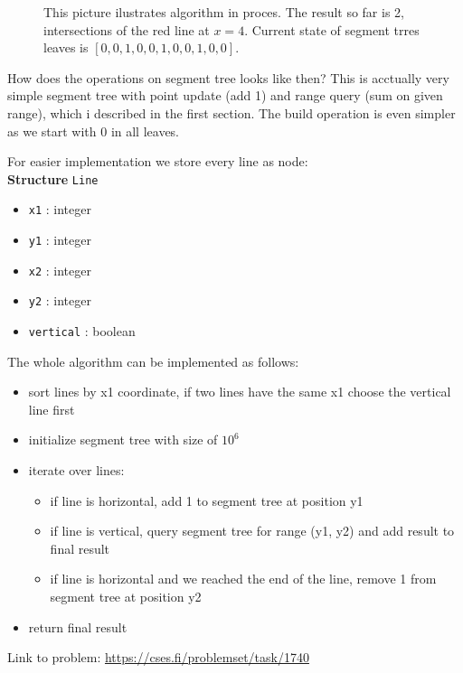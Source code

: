 \documentclass{article}
\begin{document}
\begin{figure}[H]
    \centering
    
    \caption{This picture ilustrates algorithm in proces. The result so far is 2, intersections of the red line at $x=4$. Current state of segment trres leaves is $[0,0,1,0,0,1,0,0,1,0,0]$. }
\end{figure}

How does the operations on segment tree looks like then? 
This is acctually very simple segment tree with point update (add 1) and range query (sum on given range), which i described in the first section. The build operation is even simpler as we start with 0 in all leaves.

For easier implementation we store every line as node: \\
\textbf{Structure} \texttt{Line}
\begin{itemize}
    \item \texttt{x1} : integer
    \item \texttt{y1} : integer
    \item \texttt{x2} : integer
    \item \texttt{y2} : integer
    \item \texttt{vertical} : boolean
\end{itemize}

The whole algorithm can be implemented as follows:

\begin{itemize}
    \item sort lines by x1 coordinate, if two lines have the same x1 choose the vertical line first
    \item initialize segment tree with size of $10^6$
    \item iterate over lines:
        \begin{itemize}
            \item if line is horizontal, add 1 to segment tree at position y1
            \item if line is vertical, query segment tree for range (y1, y2) and add result to final result
            \item if line is horizontal and we reached the end of the line, remove 1 from segment tree at position y2
        \end{itemize}
    \item return final result
\end{itemize}

Link to problem: \url{https://cses.fi/problemset/task/1740}
\end{document}
